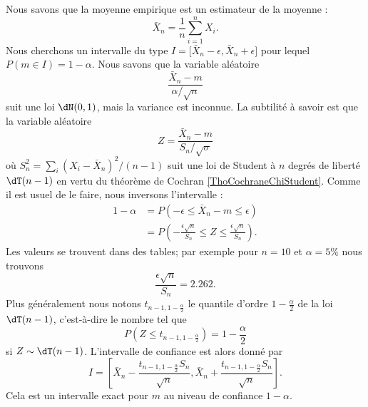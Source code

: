 \begin{example}
	Nous savons que la moyenne empirique est un estimateur de la moyenne :
	\begin{equation}
		\bar X_n=\frac{1}{ n }\sum_{i=1}^nX_i.
	\end{equation}
	Nous cherchons un intervalle du type \( I=\mathopen[ \bar X_n-\epsilon , \bar X_n+\epsilon \mathclose]\) pour lequel \( P(m\in I)=1-\alpha\). Nous savons que la variable aléatoire
	\begin{equation}
		\frac{ \bar X_n-m }{ \alpha/\sqrt{n} }
	\end{equation}
	suit une loi \( \dN(0,1)\), mais la variance est inconnue. La subtilité à savoir est que la variable aléatoire
	\begin{equation}
		Z=\frac{ \bar X_n-m }{ S_n/\sqrt{\sigma} }
	\end{equation}
	où \( S_n^2=\sum_i(X_i-\bar X_n)^2/(n-1)\) suit une loi de Student à \( n\) degrés de liberté \( \dT(n-1)\) en vertu du théorème de Cochran \ref{ThoCochraneChiStudent}. Comme il est usuel de le faire, nous inversons l'intervalle :
	\begin{subequations}
		\begin{align}
			1-\alpha & =P\left( -\epsilon\leq \bar X_n-m\leq \epsilon \right)                                         \\
			         & =P\left( -\frac{ \epsilon\sqrt{n} }{ S_n }\leq Z\leq \frac{ \epsilon\sqrt{n} }{ S_n } \right).
		\end{align}
	\end{subequations}
	Les valeurs se trouvent dans des tables; par exemple pour \( n=10\) et \( \alpha=5\%\) nous trouvons
	\begin{equation}
		\frac{ \epsilon\sqrt{n} }{ S_n }=2.262.
	\end{equation}
	Plus généralement nous notons \( t_{n-1,1-\frac{ \alpha }{2}}\) le quantile d'ordre \( 1-\frac{ \alpha }{2}\) de la loi \( \dT(n-1)\), c'est-à-dire le nombre tel que
	\begin{equation}
		P(Z\leq t_{n-1,1-\frac{ \alpha }{2}})=1-\frac{ \alpha }{2}
	\end{equation}
	si \( Z\sim\dT(n-1)\). L'intervalle de confiance est alors donné par
	\begin{equation}
		I=\left[ \bar X_n-\frac{ t_{n-1,1-\frac{ \alpha }{2}}S_n }{ \sqrt{n} },\bar X_n+\frac{ t_{n-1,1-\frac{ \alpha }{2}}S_n }{ \sqrt{n} } \right].
	\end{equation}
	Cela est un intervalle exact pour \( m\) au niveau de confiance \( 1-\alpha\).


\end{example}
